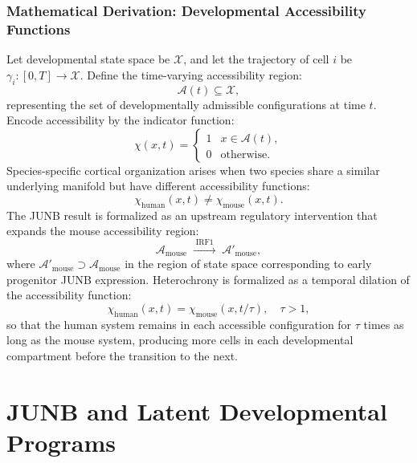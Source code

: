 \documentclass[12pt, a4paper, openany]{book}
\theoremstyle{definition}
\theoremstyle{remark}
\begin{document}
\subsection*{Mathematical Derivation: Developmental Accessibility Functions}

Let developmental state space be $\mathcal{X}$, and let the trajectory of cell $i$ be $\gamma_i : [0,T] \to \mathcal{X}$. Define the time-varying accessibility region:
\begin{equation}
\mathcal{A}(t) \subseteq \mathcal{X},
\end{equation}
representing the set of developmentally admissible configurations at time $t$. Encode accessibility by the indicator function:
\begin{equation}
\chi(x,t) = \begin{cases} 1 & x \in \mathcal{A}(t), \\ 0 & \text{otherwise}. \end{cases}
\end{equation}
Species-specific cortical organization arises when two species share a similar underlying manifold but have different accessibility functions:
\begin{equation}
\chi_{\text{human}}(x,t) \neq \chi_{\text{mouse}}(x,t).
\end{equation}
The JUNB result is formalized as an upstream regulatory intervention that expands the mouse accessibility region:
\begin{equation}
\mathcal{A}_{\text{mouse}} \;\xrightarrow{\;\text{IRF1}\;}\; \mathcal{A}'_{\text{mouse}},
\end{equation}
where $\mathcal{A}'_{\text{mouse}} \supset \mathcal{A}_{\text{mouse}}$ in the region of state space corresponding to early progenitor JUNB expression. Heterochrony is formalized as a temporal dilation of the accessibility function:
\begin{equation}
\chi_{\text{human}}(x,t) = \chi_{\text{mouse}}(x, t/\tau), \quad \tau > 1,
\end{equation}
so that the human system remains in each accessible configuration for $\tau$ times as long as the mouse system, producing more cells in each developmental compartment before the transition to the next.


\chapter{JUNB and Latent Developmental Programs}
\end{document}
